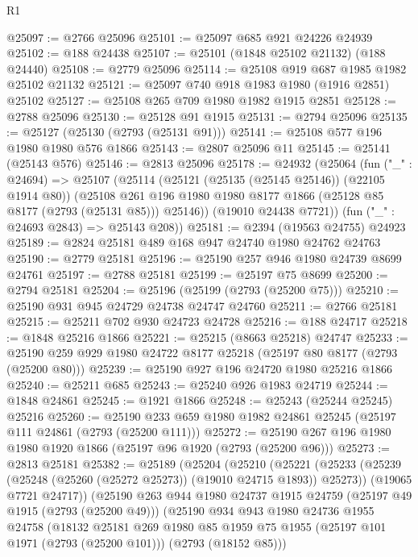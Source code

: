 \begin{lexlean}{R1}
\begin{coremodule}
@25097 := @2766 @25096
@25101 := @25097 @685 @921 @24226 @24939
@25102 := @188 @24438
@25107 := @25101 (@1848 @25102 @21132) (@188 @24440)
@25108 := @2779 @25096
@25114 := @25108 @919 @687 @1985 @1982 @25102 @21132
@25121 := @25097 @740 @918 @1983 @1980 (@1916 @2851) @25102
@25127 := @25108 @265 @709 @1980 @1982 @1915 @2851
@25128 := @2788 @25096
@25130 := @25128 @91 @1915
@25131 := @2794 @25096
@25135 := @25127 (@25130 (@2793 (@25131 @91)))
@25141 := @25108 @577 @196 @1980 @1980 @576 @1866
@25143 := @2807 @25096 @11
@25145 := @25141 (@25143 @576)
@25146 := @2813 @25096
@25178 := @24932
    (@25064
      (fun ("_" : @24694) =>
      @25107
        (@25114
          (@25121 (@25135 (@25145 @25146)) (@22105 @1914 @80))
          (@25108 @261 @196 @1980 @1980 @8177 @1866 (@25128 @85 @8177 (@2793 (@25131 @85))) @25146))
        (@19010 @24438 @7721))
      (fun ("_" : @24693 @2843) => @25143 @208))
@25181 := @2394 (@19563 @24755) @24923
@25189 := @2824 @25181 @489 @168 @947 @24740 @1980 @24762 @24763
@25190 := @2779 @25181
@25196 := @25190 @257 @946 @1980 @24739 @8699 @24761
@25197 := @2788 @25181
@25199 := @25197 @75 @8699
@25200 := @2794 @25181
@25204 := @25196 (@25199 (@2793 (@25200 @75)))
@25210 := @25190 @931 @945 @24729 @24738 @24747 @24760
@25211 := @2766 @25181
@25215 := @25211 @702 @930 @24723 @24728
@25216 := @188 @24717
@25218 := @1848 @25216 @1866
@25221 := @25215 (@8663 @25218) @24747
@25233 := @25190 @259 @929 @1980 @24722 @8177 @25218 (@25197 @80 @8177 (@2793 (@25200 @80)))
@25239 := @25190 @927 @196 @24720 @1980 @25216 @1866
@25240 := @25211 @685
@25243 := @25240 @926 @1983 @24719
@25244 := @1848 @24861
@25245 := @1921 @1866
@25248 := @25243 (@25244 @25245) @25216
@25260 := @25190 @233 @659 @1980 @1982 @24861 @25245 (@25197 @111 @24861 (@2793 (@25200 @111)))
@25272 := @25190 @267 @196 @1980 @1980 @1920 @1866 (@25197 @96 @1920 (@2793 (@25200 @96)))
@25273 := @2813 @25181
@25382 := @25189
    (@25204
      (@25210
        (@25221
          (@25233 (@25239 (@25248 (@25260 (@25272 @25273)) (@19010 @24715 @1893)) @25273))
          (@19065 @7721 @24717))
        (@25190
          @263
          @944
          @1980
          @24737
          @1915
          @24759
          (@25197 @49 @1915 (@2793 (@25200 @49)))
          (@25190
            @934
            @943
            @1980
            @24736
            @1955
            @24758
            (@18132
              @25181
              @269
              @1980
              @85
              @1959
              @75
              @1955
              (@25197 @101 @1971 (@2793 (@25200 @101)))
              (@2793 (@18152 @85)))

\end{coremodule}
\end{lexlean}
